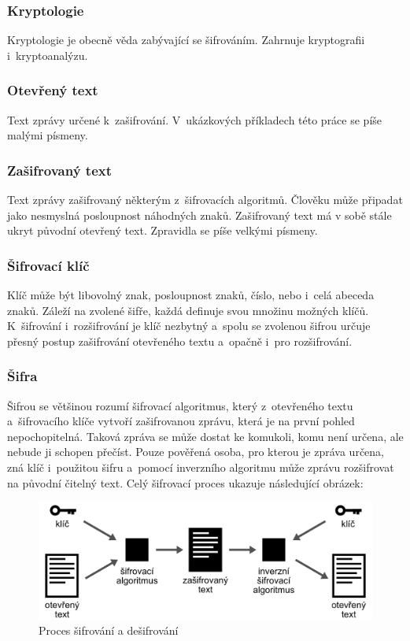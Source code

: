 \documentclass[glossaries, index]{kidiplom}
\begin{document}
\subsubsection{Kryptologie}
Kryptologie je obecně věda zabývající se šifrováním. Zahrnuje kryptografii i~kryptoanalýzu.

\subsubsection{Otevřený text}
Text zprávy určené k~zašifrování. V~ukázkových příkladech této práce se píše malými písmeny.

\subsubsection{Zašifrovaný text}
Text zprávy zašifrovaný některým z~šifrovacích algoritmů. Člověku může připadat jako nesmyslná posloupnost náhodných znaků. Zašifrovaný text má v sobě stále ukryt původní otevřený text. Zpravidla se píše velkými písmeny.

\subsubsection{Šifrovací klíč}
Klíč může být libovolný znak, posloupnost znaků, číslo, nebo i~celá abeceda znaků. Záleží na zvolené šifře, každá definuje svou množinu možných klíčů. K~šifrování i~rozšifrování je klíč nezbytný a~spolu se zvolenou šifrou určuje přesný postup zašifrování otevřeného textu a~opačně i~pro rozšifrování.

\subsubsection{Šifra}
Šifrou se většinou rozumí šifrovací algoritmus, který z~otevřeného textu a~šifrovacího klíče vytvoří zašifrovanou zprávu, která je na první pohled nepochopitelná. Taková zpráva se může dostat ke komukoli, komu není určena, ale nebude ji schopen přečíst. Pouze pověřená osoba, pro kterou je zpráva určena, zná klíč i~použitou šifru a~pomocí inverzního algoritmu může zprávu rozšifrovat na původní čitelný text. Celý šifrovací proces ukazuje následující obrázek:

\begin{figure}[htbp]
\centering
\includegraphics[scale=0.25]{graphics/encrypt_decrypt.png}
\caption{Proces šifrování a dešifrování}
\label{encrypting}
\end{figure}
\end{document}
